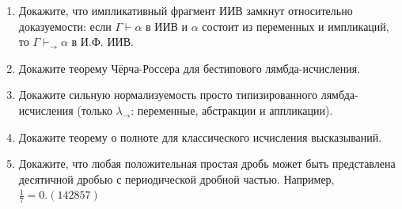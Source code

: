 \documentclass[10pt,a4paper,oneside]{article}
\begin{document}
\begin{enumerate}
\item Докажите, что импликативный фрагмент ИИВ замкнут относительно доказуемости:
если $\Gamma \vdash \alpha$ в ИИВ и $\alpha$ состоит из переменных и импликаций, 
то $\Gamma \vdash_\rightarrow \alpha$ в И.Ф. ИИВ.

\item Докажите теорему Чёрча-Россера для бестипового лямбда-исчисления.

\item Докажите сильную нормализуемость просто типизированного лямбда-исчисления (только $\lambda_\rightarrow$:
переменные, абстракции и аппликации).

\item Докажите теорему о полноте для классического исчисления высказываний.

\item Докажите, что любая положительная простая дробь может быть представлена десятичной дробью
с периодической дробной частью. Например, $\frac{1}{7} = 0.(142857)$
\end{enumerate}
\end{document}
